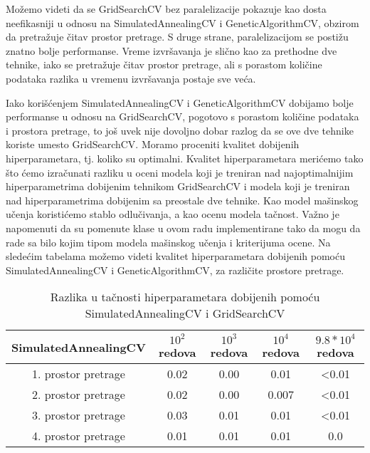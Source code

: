 \documentclass{article}
\begin{document}
\noindent Možemo videti da se GridSearchCV bez paralelizacije pokazuje kao dosta neefikasniji u odnosu na SimulatedAnnealingCV i GeneticAlgorithmCV, obzirom da pretražuje čitav prostor pretrage. S druge strane, paralelizacijom se postižu znatno bolje performanse. Vreme izvršavanja je slično kao za prethodne dve tehnike, iako se pretražuje čitav prostor pretrage, ali s porastom količine podataka razlika u vremenu izvršavanja postaje sve veća. \newline

\noindent Iako korišćenjem SimulatedAnnealingCV i GeneticAlgorithmCV dobijamo bolje performanse u odnosu na GridSearchCV, pogotovo s porastom količine podataka i prostora pretrage, to još uvek nije dovoljno dobar razlog da se ove dve tehnike koriste umesto GridSearchCV. Moramo proceniti kvalitet dobijenih hiperparametara, tj. koliko su optimalni. Kvalitet hiperparametara merićemo tako što ćemo izračunati razliku u oceni modela koji je treniran nad najoptimalnijim hiperparametrima dobijenim tehnikom GridSearchCV i modela koji je treniran nad hiperparametrima dobijenim sa preostale dve tehnike. Kao model mašinskog učenja koristićemo stablo odlučivanja, a kao ocenu modela tačnost. Važno je napomenuti da su pomenute klase u ovom radu implementirane tako da mogu da rade sa bilo kojim tipom modela mašinskog učenja i kriterijuma ocene. Na sledećim tabelama možemo videti kvalitet hiperparametara dobijenih pomoću SimulatedAnnealingCV i GeneticAlgorithmCV, za različite prostore pretrage.  \newline
\newpage
\begin{table}[h]
\centering
\begin{tabular}{|c|c|c|c|c|}
\hline
 SimulatedAnnealingCV& $10^2$ redova & $10^3$ redova & $10^4$ redova & $9.8*10^4$ redova \\
\hline
1. prostor pretrage & 0.02 & 0.00 & 0.01 & <0.01\\
\hline
2. prostor pretrage & 0.02 & 0.00 & 0.007 & <0.01\\
\hline
3. prostor pretrage & 0.03 & 0.01 & 0.01 & <0.01\\
\hline
4. prostor pretrage & 0.01 & 0.01  & 0.01 & 0.0\\
\hline
\end{tabular}
\caption{Razlika u tačnosti hiperparametara dobijenih pomoću SimulatedAnnealingCV i GridSearchCV}
\end{table}
\end{document}
